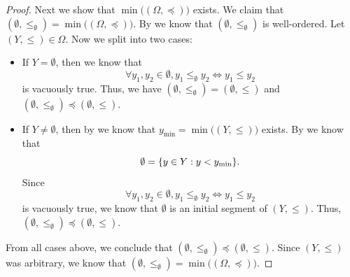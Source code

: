 \begin{proof}
  Next we show that \(\min\big((\Omega, \preceq)\big)\) exists.
  We claim that \((\emptyset, \leq_{\emptyset}) = \min\big((\Omega, \preceq)\big)\).
  By  we know that \((\emptyset, \leq_{\emptyset})\) is well-ordered.
  Let \((Y, \leq) \in \Omega\).
  Now we split into two cases:
  \begin{itemize}
    \item If \(Y = \emptyset\), then we know that
          \[
            \forall y_1, y_2 \in \emptyset, y_1 \leq_{\emptyset} y_2 \iff y_1 \leq y_2
          \]
          is vacuously true.
          Thus, we have \((\emptyset, \leq_{\emptyset}) = (\emptyset, \leq)\) and \((\emptyset, \leq_{\emptyset}) \preceq (\emptyset, \leq)\).
    \item If \(Y \neq \emptyset\), then by  we know that \(y_{\min} = \min\big((Y, \leq)\big)\) exists.
          By  we know that
          \[
            \emptyset = \set{y \in Y : y < y_{\min}}.
          \]
          Since
          \[
            \forall y_1, y_2 \in \emptyset, y_1 \leq_{\emptyset} y_2 \iff y_1 \leq y_2
          \]
          is vacuously true, we know that \(\emptyset\) is an initial segment of \((Y, \leq)\).
          Thus, \((\emptyset, \leq_{\emptyset}) \preceq (\emptyset, \leq)\).
  \end{itemize}
  From all cases above, we conclude that \((\emptyset, \leq_{\emptyset}) \preceq (\emptyset, \leq)\).
  Since \((Y, \leq)\) was arbitrary, we know that \((\emptyset, \leq_{\emptyset}) = \min\big((\Omega, \preceq)\big)\).


\end{proof}
